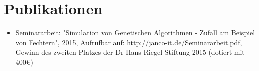 \documentclass[11pt,a4paper,sans]{moderncv}        %
\begin{document}
\section{Publikationen}

\vspace{6pt}

\begin{itemize}

\item{Seminararbeit: "Simulation von Genetischen Algorithmen - Zufall am Beispiel von Fechtern", 2015, Aufrufbar auf: http://janco-it.de/Seminararbeit.pdf, Gewinn des zweiten Platzes der Dr Hans Riegel-Stiftung 2015 (dotiert mit 400\euro)}

\end{itemize}



\end{document}
